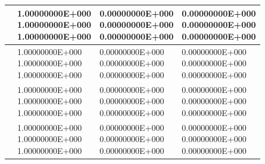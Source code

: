 \begin{table}
\begin{tabularx}{1.0\textwidth}{| >{\raggedright\arraybackslash}X | >{\raggedright\arraybackslash}X | >{\raggedright\arraybackslash}X |>{\raggedright\arraybackslash}X |}
		\centering{($0.5; 0.5; 1.5$)} & \centering{1.00000000E+000 \\ 1.00000000E+000\\
			1.00000000E+000}& \centering{0.00000000E+000 \\ 0.00000000E+000 \\ 0.00000000E+000} & \centering{0.00000000E+000 \\ 0.00000000E+000 \\ 0.00000000E+000} \tabularnewline \hline
		
		\centering{($1.5; 0.5; 1.5$)} & \centering{1.00000000E+000 \\ 1.00000000E+000\\
			1.00000000E+000}& \centering{0.00000000E+000 \\ 0.00000000E+000 \\ 0.00000000E+000} & \centering{0.00000000E+000 \\ 0.00000000E+000 \\ 0.00000000E+000} \tabularnewline \hline
		
		\centering{($0.5; 1.5; 1.5$)} & \centering{1.00000000E+000 \\ 1.00000000E+000\\
			1.00000000E+000}& \centering{0.00000000E+000 \\ 0.00000000E+000 \\ 0.00000000E+000} & \centering{0.00000000E+000 \\ 0.00000000E+000 \\ 0.00000000E+000} \tabularnewline \hline
		
		\centering{($1.5; 1.5; 1.5$)} & \centering{1.00000000E+000 \\ 1.00000000E+000\\
			1.00000000E+000}& \centering{0.00000000E+000 \\ 0.00000000E+000 \\ 0.00000000E+000} & \centering{0.00000000E+000 \\ 0.00000000E+000 \\ 0.00000000E+000} \tabularnewline \hline
	
	\end{tabularx}
	\label{tab:test10}
\end{table}

